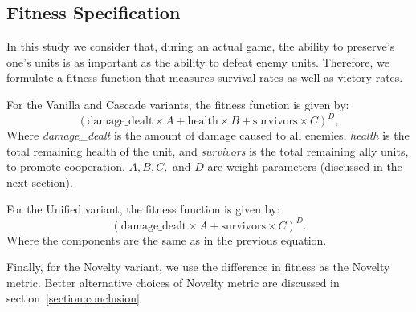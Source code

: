 \subsection{Fitness Specification}\label{subsec:fitness-specification}

In this study we consider that, during an actual game, the ability
to preserve's one's units is as important as the ability to defeat
enemy units. Therefore, we formulate a fitness function that
measures survival rates as well as victory rates.

For the Vanilla and Cascade variants, the fitness function is
given by:
\begin{equation}\label{eq:fitness_unit}
  (\text{damage\_dealt} \times A + \text{health} \times B +
  \text{survivors} \times C)^D,
\end{equation}
Where \emph{damage\_dealt} is the amount of damage caused to all
enemies, \emph{health} is the total remaining health of the unit, and
\emph{survivors} is the total remaining ally units, to promote
cooperation. $A, B, C,$ and $D$ are weight parameters (discussed in
the next section).

For the Unified variant, the fitness function is given by:
\begin{equation}\label{eq:fitness_group}
  (\text{damage\_dealt} \times A + \text{survivors} \times C)^D.
\end{equation}
Where the components are the same as in the previous equation.

Finally, for the Novelty variant, we use the difference in fitness as
the Novelty metric. Better alternative choices of Novelty metric are
discussed in section~\ref{section:conclusion}
